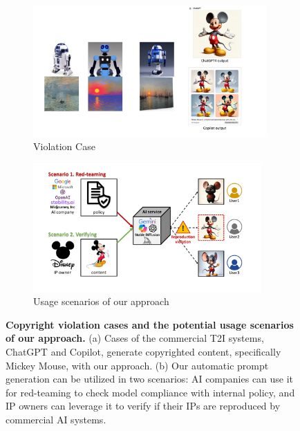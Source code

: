 
\begin{figure}
    \hfill
    \centering
    \begin{subfigure}[t]{0.18\textwidth}
        \centering
        \includegraphics[width=0.98\textwidth]{figure_folder/violation.pdf}
        \vspace{-0.2in}
        \caption{\small Violation Case}
        \label{fig1b:violation1}
    \end{subfigure}
    \begin{subfigure}[t]{0.73\textwidth}
        \centering
        \includegraphics[width=0.96\textwidth]{figure_folder/problem.pdf}
        \vspace{-0.05in}
        \caption{\small Usage scenarios of our approach}
        \label{fig1a:problem}
    \end{subfigure}
    \hfill
    \vspace{-0.07in}
    \caption{\small \textbf{Copyright violation cases and the potential usage scenarios of our approach.} (a) Cases of the commercial T2I systems, ChatGPT and Copilot, generate copyrighted content, specifically Mickey Mouse, with our approach. (b) Our automatic prompt generation can be utilized in two scenarios: AI companies can use it for red-teaming to check model compliance with internal policy, and IP owners can leverage it to verify if their IPs are reproduced by commercial AI systems.}
    \label{fig1} 
    \vspace{-0.26in}
\end{figure}
